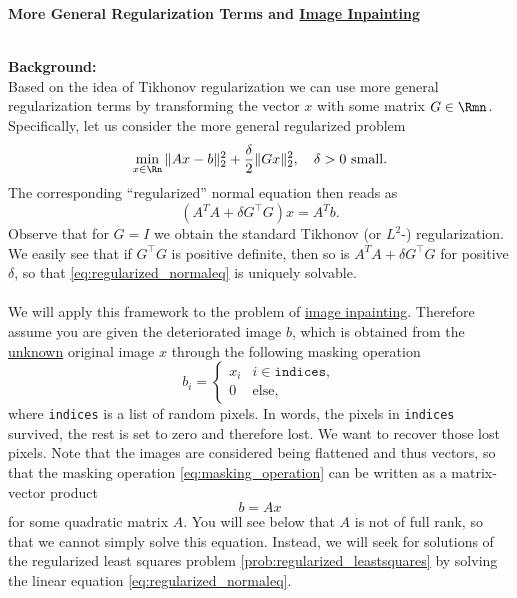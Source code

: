 \textbf{\normalsize More General Regularization Terms and \hyperref{https://en.wikipedia.org/wiki/Inpainting}{}{}{Image Inpainting}}

~\\
{\color{navy}
	\textbf{Background:}\\
	Based on the idea of Tikhonov regularization we can use more general regularization terms by transforming the vector $x$ with some matrix $G\in\Rmn$. Specifically, let us consider the more general regularized problem
	\begin{equation} \label{prob:regularized_leastsquares}
	\min_{x\in \Rn} \|Ax-b\|_2^2 + \frac{\delta}{2}\|Gx\|_2^2,~~~\delta > 0 ~\text{small}.
	\end{equation}
	The corresponding ``regularized'' normal equation then reads as 
	\begin{equation}\label{eq:regularized_normaleq}
	(A^TA  + \delta G^\top G)x = A^Tb. 
	\end{equation}
	Observe that for $G = I$ we obtain the standard Tikhonov (or $L^2$-) regularization. We easily see that if $G^\top G$ is positive definite, then so is $A^TA  + \delta G^\top G$ for positive $\delta$, so that \eqref{eq:regularized_normaleq} is uniquely solvable.\\~\\ 
	We will apply this framework to the problem of \hyperref{https://en.wikipedia.org/wiki/Inpainting}{}{}{image inpainting}. Therefore assume you are given the deteriorated image $b$, which is obtained from the \underline{unknown} original image $x$ through the following masking operation
	\begin{equation} \label{eq:masking_operation}
		b_i = \begin{cases}
		x_i & i \in \texttt{indices},\\
		0 & \text{else},
		\end{cases}
	\end{equation}
	where \texttt{indices} is a list of random pixels. In words, the pixels in \texttt{indices} survived, the rest is set to zero and therefore lost. We want to recover those lost pixels. Note that the images are considered being flattened and thus vectors, so that the masking operation \eqref{eq:masking_operation} can be written as a matrix-vector product
	$$b = Ax $$
	for some quadratic matrix $A$. You will see below that $A$ is not of full rank, so that we cannot simply solve this equation. Instead, we will seek for solutions of the regularized least squares problem \eqref{prob:regularized_leastsquares} by solving the linear equation \eqref{eq:regularized_normaleq}. 
}
